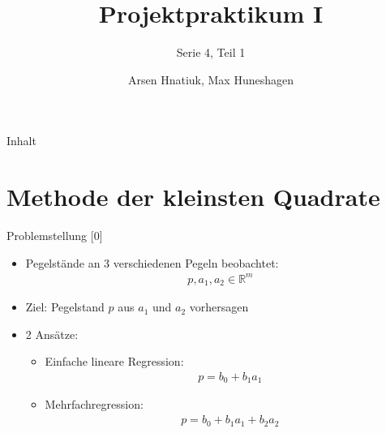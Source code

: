 \documentclass{beamer}
\title{Projektpraktikum I}
\subtitle{Serie 4, Teil 1}
\author{Arsen Hnatiuk, Max Huneshagen}
\begin{document}
\begin{frame}
  \maketitle
\end{frame}

\begin{frame}{Inhalt}
  \tableofcontents
  

  
 
\end{frame}
 \section{Methode der kleinsten Quadrate}  
\begin{frame}{Problemstellung [0]}
	\begin{itemize}
		\item Pegelstände an 3 verschiedenen Pegeln beobachtet:
		\begin{align}
		p, a_1, a_2 \in \mathbb{R}^m
		\end{align}
		\item Ziel: Pegelstand $p$ aus $a_1$ und $a_2$ vorhersagen
		\pause
		\item 2 Ansätze:
		\begin{itemize}
			\item Einfache lineare Regression:
			\begin{align}
			p =b_0+b_1a_1
			\label{eq:lin_reg}
			\end{align}
			\item Mehrfachregression:
			\begin{align}
			p =b_0+b_1a_1+b_2a_2
			\label{eq:mehr_reg}
			\end{align}
		\end{itemize}
	\end{itemize}
	
\end{frame}
\end{document}
